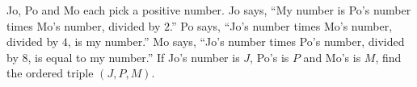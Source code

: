 Jo, Po and Mo each pick a positive number. Jo says, ``My number is Po's number times Mo's number, divided by $2$.'' Po says, ``Jo's number times Mo's number, divided by $4$, is my number.'' Mo says, ``Jo's number times Po's number, divided by $8$, is equal to my number.'' If Jo's number is $J$, Po's is $P$ and Mo's is $M$, find the ordered triple $(J,P,M)$.
